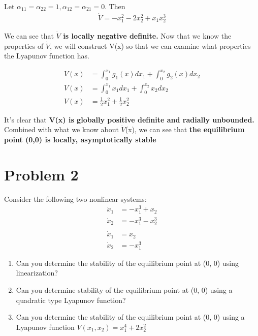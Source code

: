 \documentclass{article}
\begin{document}
  Let $\alpha_{11}=\alpha_{22}=1, \alpha_{12}=\alpha_{21}=0$. Then
  \begin{align*}
    \dot{V} = -x_1^2 - 2x_2^2 + x_1x_2^3
  \end{align*}
  
  \noindent We can see that \textbf{$\dot{V}$ is locally negative definite.} \newpage
  Now that we know the properties of $\dot{V}$, we will construct V(x) so that
  we can examine what properties the Lyapunov function has.

  \begin{align*}
    V(x) &= \int_{0}^{x_1} g_1(x)dx_1 + \int_{0}^{x_2} g_2(x)dx_2 \\
    V(x) &= \int_{0}^{x_1} x_1dx_1 + \int_{0}^{x_2} x_2dx_2 \\
    V(x) &= \frac{1}{2}x_1^2 + \frac{1}{2}x_2^2
  \end{align*}

  It's clear that \textbf{V(x) is globally positive definite and radially
    unbounded.} \newline \newline
  Combined with what we know about $\dot{V}$(x), we can see that \textbf{the equilibrium
  point (0,0) is locally, asymptotically stable}

  \newpage

  \section{Problem 2}

  Consider the following two nonlinear systems:
  \begin{align*}
    \dot{x}_1 &= -x_1^3 + x_2 \\
    \dot{x}_2 &= -x_1^3 - x_2^3 \\ \\
    \dot{x}_1 &= x_2 \\
    \dot{x}_2 &= -x_1^3
  \end{align*}

  \begin{enumerate}[label=(\roman*)]
    \item Can you determine the stability of the equilibrium point at (0, 0)
      using linearization?
    \item Can you determine stability of the equilibrium point at (0, 0) using a
      quadratic type Lyapunov function?
    \item Can you determine the stability of the equilibrium point at (0, 0)
      using a Lyapunov function $V(x_1, x_2) = x_1^4 + 2x_2^2$
  \end{enumerate} 
\end{document}
